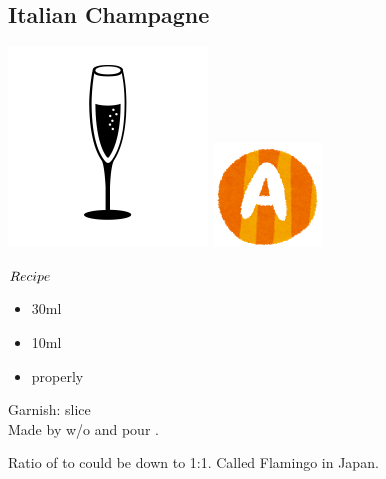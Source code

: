 \subsection{Italian Champagne}
\vspace{-7.4mm}
\hspace{49mm}
\includegraphics[scale=.08]{cocktail_glass_flute.png}
\includegraphics[scale=.12]{capital_a.png}
\vspace{2.5mm}
\begin{itembox}[l]{\boldmath $Recipe$}
\begin{itemize}
\setlength{\parskip}{0cm}
\setlength{\itemsep}{0cm}
\item \vodka 30ml
\item \campari 10ml
\item \champagne properly
\end{itemize}
\vspace{-4mm}
Garnish: \orange slice\\
Made by \shake w/o \champagne and pour \champagne
\hspace{-1mm}.
\end{itembox}
Ratio of \vodka to \campari could be down to 1:1. Called Flamingo in Japan.
